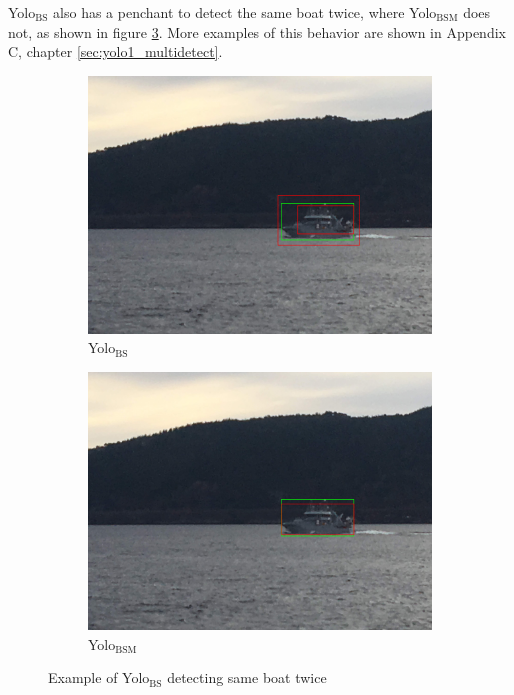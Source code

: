 \newpage

Yolo$_{\text{BS}}$ also has a penchant to detect the same boat twice, where Yolo$_{\text{BSM}}$ does not, as shown in figure \ref{fig:yolo12_multibox}. More examples of this behavior are shown in Appendix C, chapter \ref{sec:yolo1_multidetect}.

\begin{figure}[h!]
\begin{subfigure}{.5\textwidth}
  \centering
  \includegraphics[width=0.8\linewidth]{results/case_tr_moor/yolo12/yolo1/2better/IMG_2269.jpg}
  \caption{Yolo$_{\text{BS}}$}
  \label{fig:yolo1_multibox}
\end{subfigure}%
\begin{subfigure}{.5\textwidth}
  \centering
  \includegraphics[width=.8\linewidth]{results/case_tr_moor/yolo12/yolo2/2better/IMG_2269.jpg}
  \caption{Yolo$_{\text{BSM}}$}
  \label{fig:yolo2_multibox}
\end{subfigure}
\caption{Example of Yolo$_{\text{BS}}$ detecting same boat twice}
\label{fig:yolo12_multibox}
\end{figure}

